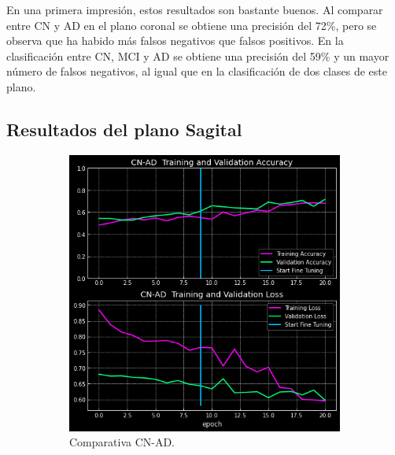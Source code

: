 En una primera impresión, estos resultados son bastante buenos.
Al comparar entre CN y AD en el plano coronal se obtiene una precisión del 72\%, pero se observa que ha habido más
falsos negativos que falsos positivos.
En la clasificación entre CN, MCI y AD se obtiene una precisión del 59\% y un mayor número de falsos negativos, al
igual que en la clasificación de dos clases de este plano.

\subsection{Resultados del plano Sagital}\label{subsec:resultados-del-plano-sagital}

\begin{figure}[H]
    \centering
    \begin{subfigure}{0.4\textwidth}
        \includegraphics[width=\textwidth]{./imgs/resultados/sagittal/CN_AD_output_SAGITTAL}
        \caption{Comparativa CN-AD. }
        \label{fig:sagital-cn-ad}
    \end{subfigure}
    \hspace*{\fill}
    \begin{subfigure}{0.4\textwidth}

\end{subfigure}
\end{figure}
